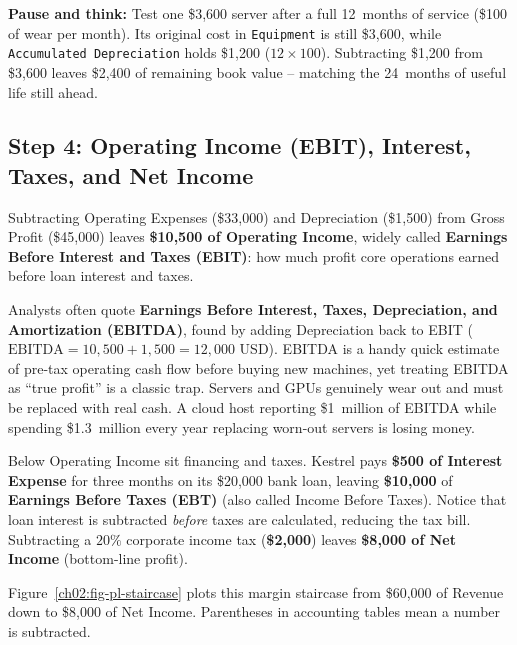 \begin{recoverybox}
\textbf{Pause and think:} Test one \$3,600 server after a full 12~months of service (\$100 of wear per month). Its original cost in \texttt{Equipment} is still \$3,600, while \texttt{Accumulated Depreciation} holds \$1,200 ($12 \times 100$). Subtracting \$1,200 from \$3,600 leaves \$2,400 of remaining book value -- matching the 24~months of useful life still ahead.
\end{recoverybox}

\subsection*{Step 4: Operating Income (EBIT), Interest, Taxes, and Net Income}

Subtracting Operating Expenses (\$33,000) and Depreciation (\$1,500) from Gross Profit (\$45,000) leaves \textbf{\$10,500 of Operating Income}, widely called \textbf{Earnings Before Interest and Taxes (EBIT)}: how much profit core operations earned before loan interest and taxes.

\begin{trapbox}
Analysts often quote \textbf{Earnings Before Interest, Taxes, Depreciation, and Amortization (EBITDA)}, found by adding Depreciation back to EBIT ($\text{EBITDA} = 10{,}500 + 1{,}500 = 12{,}000$ USD). EBITDA is a handy quick estimate of pre-tax operating cash flow before buying new machines, yet treating EBITDA as ``true profit'' is a classic trap. Servers and GPUs genuinely wear out and must be replaced with real cash. A cloud host reporting \$1~million of EBITDA while spending \$1.3~million every year replacing worn-out servers is losing money.
\end{trapbox}

Below Operating Income sit financing and taxes. Kestrel pays \textbf{\$500 of Interest Expense} for three months on its \$20,000 bank loan, leaving \textbf{\$10,000} of \textbf{Earnings Before Taxes (EBT)} (also called Income Before Taxes). Notice that loan interest is subtracted \emph{before} taxes are calculated, reducing the tax bill. Subtracting a $20\%$ corporate income tax (\textbf{\$2,000}) leaves \textbf{\$8,000 of Net Income} (bottom-line profit).

Figure~\ref{ch02:fig-pl-staircase} plots this margin staircase from \$60,000 of Revenue down to \$8,000 of Net Income. Parentheses in accounting tables mean a number is subtracted.

